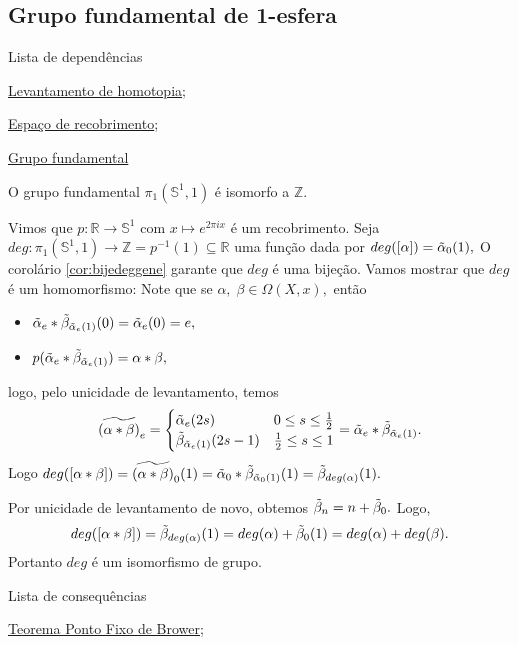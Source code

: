 \subsection{Grupo fundamental de 1-esfera}
\label{grupo-fundamental-de-S1-prop}
\begin{titlemize}{Lista de dependências}
	\item \hyperref[levantamento-de-homotopia-prop]{Levantamento de homotopia};\\ %
	\item \hyperref[espaco-de-recobrimento-def]{Espaço de recobrimento};\\
    \item \hyperref[grupo-fundamental]{Grupo fundamental}
\end{titlemize}

\begin{thm}
    O grupo fundamental $\pi_1(\mathbb{S}^1,1)$ é isomorfo a $\mathbb{Z}.$ 
\end{thm}

\begin{dem}
Vimos que $p:\mathbb{R}\rightarrow \mathbb{S}^1$ com $x\mapsto e^{2\pi i x}$ é um recobrimento. Seja $deg:\pi_1(\mathbb{S}^1,1)\rightarrow \mathbb{Z}=p^{-1}(1)\subseteq \mathbb{R}$ uma função dada por $deg([\alpha])=\Tilde{\alpha}_0(1),$ O corolário \ref{cor:bijedeggene} garante que $deg$ é uma bijeção. Vamos mostrar que $deg$ é um homomorfismo: Note que se $\alpha,\;\beta\in \Omega(X,x),$ então
\begin{itemize}
    \item $\Tilde{\alpha}_e*\Tilde{\beta}_{\Tilde{\alpha}_e (1)}(0)=\Tilde{\alpha}_e(0)=e,$
    \item $p(\Tilde{\alpha}_e*\Tilde{\beta}_{\Tilde{\alpha}_e (1)})=\alpha *\beta,$
\end{itemize}
logo, pelo unicidade de levantamento, temos 
\begin{align*}
\widetilde{(\alpha*\beta)}_e=\begin{cases}
    \Tilde{\alpha}_e (2s)\qquad& 0\le s\le \frac{1}{2}\\
    \Tilde{\beta}_{\Tilde{\alpha}_e (1)}(2s-1)&\frac{1}{2}\le s\le 1
    \end{cases}=\Tilde{\alpha}_e*\Tilde{\beta}_{\Tilde{\alpha}_e (1)}.
\end{align*}
Logo $deg([\alpha*\beta])=\widetilde{(\alpha*\beta)}_0 (1)=\Tilde{\alpha}_0*\Tilde{\beta}_{\Tilde{\alpha}_0 (1)}(1)=\Tilde{\beta}_{deg(\alpha)}(1).$

Por unicidade de levantamento de novo, obtemos $\Tilde{\beta}_n=n+\Tilde{\beta}_0.$ Logo,
\[deg([\alpha*\beta])=\Tilde{\beta}_{deg(\alpha)}(1)=deg(\alpha)+\Tilde{\beta}_0 (1)=deg(\alpha)+deg(\beta).\]
Portanto $deg$ é um isomorfismo de grupo.
\end{dem}

\begin{titlemize}{Lista de consequências}
	\item \hyperref[teo-ponto-fixo-brower]{Teorema Ponto Fixo de Brower};
\end{titlemize}
